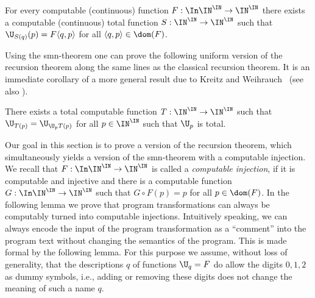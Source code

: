 \begin{thm}[smn]
\label{thm:smn}
For every computable (continuous) function ${F:\In\IN^\IN\to\IN^\IN}$ 
there exists a computable (continuous) total function
$S:\IN^\IN\to\IN^\IN$ such that $\U_{S(q)}(p)=F\langle q,p\rangle$ for all $\langle q,p\rangle\in\dom(F)$.
\end{thm}

\noindent
Using the smn-theorem one can prove the following uniform version of the recursion theorem along the same lines as the classical recursion theorem.
It is an immediate corollary of a more general result due to Kreitz and Weihrauch~\cite[Theorem~3.4]{KW85}  (see also \cite[Theorem~3.3.20]{Wei87}).

\begin{thm}
\label{thm:recursion-theorem}
There exists a total computable function ${T:\IN^\IN\to\IN^\IN}$ such that 
$\U_{T(p)}=\U_{\U_pT(p)}$
for all $p\in\IN^\IN$ such that $\U_p$ is total.
\end{thm}

\noindent
Our goal in this section is to prove a version of the recursion theorem, which simultaneously yields a
version of the smn-theorem with a computable injection. 
We recall that $F:\In\IN^\IN\to\IN^\IN$ is called a {\em computable injection}, if it is computable
and injective and there is a computable function $G:\In\IN^\IN\to\IN^\IN$ such that
$G\circ F(p)=p$ for all $p\in\dom(F)$.
In the following lemma we prove that program transformations can always be computably turned
into computable injections. 
Intuitively speaking, we can always encode the input of the program transformation
as a ``comment'' into the program text without changing the semantics of the program.
This is made formal by the following lemma.
For this purpose we assume, without loss of generality, that the descriptions $q$ of functions $\U_q=F$ do 
allow the digits $0,1,2$ as dummy symbols, i.e., adding or removing these digits does not change 
the meaning of such a name $q$.


